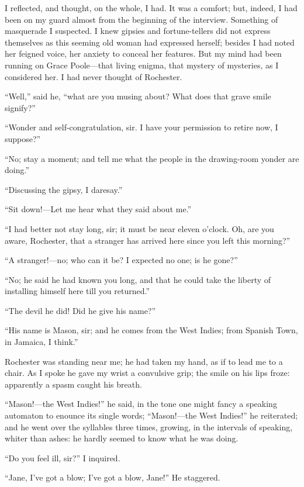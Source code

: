 I reflected, and thought, on the whole, I had. It was a comfort; but,
indeed, I had been on my guard almost from the beginning of the
interview. Something of masquerade I suspected. I knew gipsies and
fortune-tellers did not express themselves as this seeming old woman had
expressed herself; besides I had noted her feigned voice, her anxiety to
conceal her features. But my mind had been running on Grace
Poole---that living enigma, that mystery of mysteries, as I considered
her. I had never thought of \Mr{} Rochester.

\enquote{Well,} said he, \enquote{what are you musing about? What does
	that grave smile signify?}

\enquote{Wonder and self-congratulation, sir. I have your permission to
	retire now, I suppose?}

\enquote{No; stay a moment; and tell me what the people in the
	drawing-room yonder are doing.}

\enquote{Discussing the gipsy, I daresay.}

\enquote{Sit down!---Let me hear what they said about me.}

\enquote{I had better not stay long, sir; it must be near eleven
	o'clock. Oh, are you aware, \Mr{} Rochester, that a stranger has arrived
	here since you left this morning?}

\enquote{A stranger!---no; who can it be? I expected no one; is he
	gone?}

\enquote{No; he said he had known you long, and that he could take the
	liberty of installing himself here till you returned.}

\enquote{The devil he did! Did he give his name?}

\enquote{His name is Mason, sir; and he comes from the West Indies; from
	Spanish Town, in Jamaica, I think.}

\Mr{} Rochester was standing near me; he had taken my hand, as if to lead
me to a chair. As I spoke he gave my wrist a convulsive grip; the smile
on his lips froze: apparently a spasm caught his breath.

\enquote{Mason!---the West Indies!} he said, in the tone one might fancy
a speaking automaton to enounce its single words; \enquote{Mason!---the
	West Indies!} he reiterated; and he went over the syllables three times,
growing, in the intervals of speaking, whiter than ashes: he hardly
seemed to know what he was doing.

\enquote{Do you feel ill, sir?} I inquired.

\enquote{Jane, I've got a blow; I've got a blow, Jane!} He staggered.

